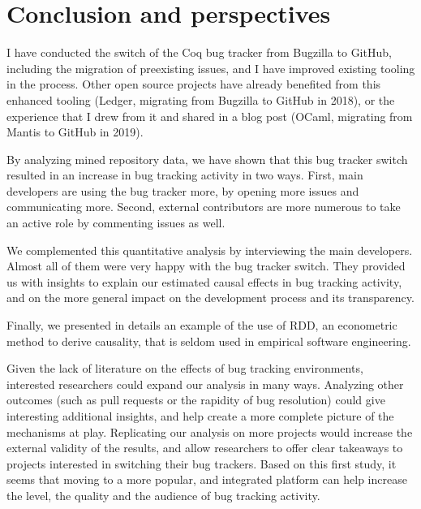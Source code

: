 \section{Conclusion and perspectives}

I have conducted the switch of the Coq bug tracker from Bugzilla to GitHub, including the migration of preexisting issues, and I have improved existing tooling in the process.
Other open source projects have already benefited from this enhanced tooling (Ledger, migrating from Bugzilla to GitHub in 2018), or the experience that I drew from it and shared in a blog post (OCaml, migrating from Mantis to GitHub in 2019).

By analyzing mined repository data, we have shown that this bug tracker switch resulted in an increase in bug tracking activity in two ways. First, main developers are using the bug tracker more, by opening more issues and communicating more. Second, external contributors are more numerous to take an active role by commenting issues as well.

We complemented this quantitative analysis by interviewing the main developers. Almost all of them were very happy with the bug tracker switch. They provided us with insights to explain our estimated causal effects in bug tracking activity, and on the more general impact on the development process and its transparency.

Finally, we presented in details an example of the use of RDD, an econometric method to derive causality, that is seldom used in empirical software engineering.

Given the lack of literature on the effects of bug tracking environments, interested researchers could expand our analysis in many ways. Analyzing other outcomes (such as pull requests or the rapidity of bug resolution) could give interesting additional insights, and help create a more complete picture of the mechanisms at play.
Replicating our analysis on more projects would increase the external validity of the results, and allow researchers to offer clear takeaways to projects interested in switching their bug trackers. Based on this first study, it seems that moving to a more popular, and integrated platform can help increase the level, the quality and the audience of bug tracking activity.
